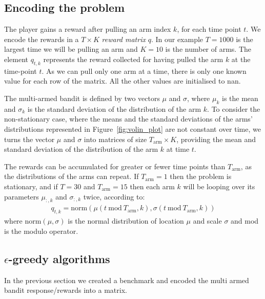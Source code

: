 \documentclass[]{scrartcl}
\theoremstyle{definition}
\begin{document}
\subsection*{Encoding the problem}
The player gains a reward after pulling an arm index $k$, for each time point $t$. We encode the rewards in a $T\times K$ \emph{reward matrix} $q$. In our example $T=1000$ is the largest time we will be pulling an arm and $K=10$ is the number of arms. The element $q_{t, k}$ represents the reward collected for having pulled the arm $k$ at the time-point $t$. As we can pull only one arm at a time, there is only one known value for each row of the matrix. All the other values are initialised to nan.

The multi-armed bandit is defined by two vectors $\mu$ and $\sigma$, where $\mu_k$ is the mean and $\sigma_k$ is the standard deviation of the distribution of the arm $k$.
To consider the non-stationary case, where the means and the standard deviations of the arms' distributions represented in Figure~\ref{fig:volin_plot} are not constant over time, we turns the vector $\mu$ and $\sigma$ into matrices of size $T_{\text{arm}} \times K$, providing the mean and standard deviation of the distribution of the arm $k$ at time $t$.

The rewards can be accumulated for greater or fewer time points than $T_{\text{arm}}$, as the distributions of the arms can repeat. If $T_{\text{arm}}=1$ then the problem is stationary, and if $T=30$ and $T_{\text{arm}}=15$ then each arm $k$ will be looping over its parameters $\mu_{:, k}$ and $\sigma_{:, k}$ twice, according to:
\begin{align*}
q_{t, k}
=
\text{norm}\left(\mu({t~\text{mod}~T_{\text{arm}}, k}), \sigma({t~\text{mod}~T_{\text{arm}}, k})\right)
\end{align*}
where $\text{norm}(\mu, \sigma)$ is the normal distribution of location $\mu$ and scale $\sigma$ and mod is the modulo operator.

\subsection*{$\epsilon$-greedy algorithms}

In the previous section we created a benchmark and encoded the multi armed bandit response/rewards into a matrix.
\end{document}
